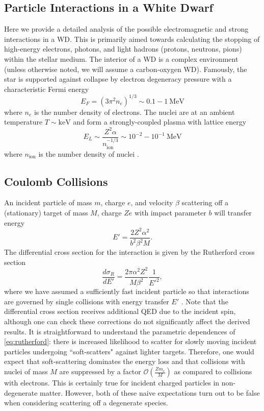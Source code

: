 \documentclass[twocolumn,showpacs,preprintnumbers,amsmath,amssymb,prd]{revtex4}
\newcommand{\OO}{\mathcal{O}}
\def\r{\right)}
\def\l{\left(}
\begin{document}
\begin{appendices}

\section{Particle Interactions in a White Dwarf}
\label{sec:appendix}
Here we provide a detailed analysis of the possible electromagnetic and strong interactions in a WD.
This is primarily aimed towards calculating the stopping of high-energy electrons, photons, and light hadrons (protons, neutrons, pions) within the stellar medium.
The interior of a WD is a complex environment (unless otherwise noted, we will assume a carbon-oxygen WD).
Famously, the star is supported against collapse by electron degeneracy pressure with a characteristic Fermi energy
\begin{equation}
E_F = (3 \pi^2 n_e)^{1/3} \sim 0.1 - 1 ~\text{MeV}
\end{equation}
where $n_e$ is the number density of electrons.
The nuclei are at an ambient temperature $T \sim \text{keV}$ and form a strongly-coupled plasma with lattice energy
\begin{equation}
\label{eq:lattice}
E_L \sim \frac{Z^2 \alpha}{n_\text{ion}^{-1/3}} \sim 10^{-2} - 10^{-1} ~\text{MeV}
\end{equation}
where $n_\text{ion}$ is the number density of nuclei \cite{Teukolsky}.


\subsection*{Coulomb Collisions}

An incident particle of mass $m$, charge $e$, and velocity $\beta$ scattering off a (stationary) target of mass $M$, charge $Ze$ with impact parameter $b$ will transfer energy
\begin{equation}
\label{eq:impact}
E' = \frac{2 Z^2 \alpha^2}{b^2 \beta ^2 M}.
\end{equation}
The differential cross section for the interaction is given by the Rutherford cross section
\begin{equation}
\label{eq:rutherford}
\frac{d \sigma_R}{dE'} = \frac{2 \pi  \alpha^2 Z^2}{M \beta^2} \frac{1}{E'^2},
 \end{equation}
where we have assumed a sufficiently fast incident particle so that interactions are governed by single collisions with energy transfer $E'$ \cite{Agashe:2014kda}.
 Note that the differential cross section receives additional QED due to the incident spin, although one can check these corrections do not significantly affect the derived results.
It is straightforward to understand the parametric dependences of \eqref{eq:rutherford}: there is increased likelihood to scatter for slowly moving incident particles undergoing ``soft-scatters" against lighter targets.
Therefore, one would expect that soft-scattering dominates the energy loss and that collisions with nuclei of mass $M$ are suppressed by a factor $\OO\l\frac{Z m_e}{M}\r$ as compared to collisions with electrons.
This is certainly true for incident charged particles in non-degenerate matter.
However, both of these naive expectations turn out to be false when considering scattering off a degenerate species.


\end{appendices}
\end{document}

